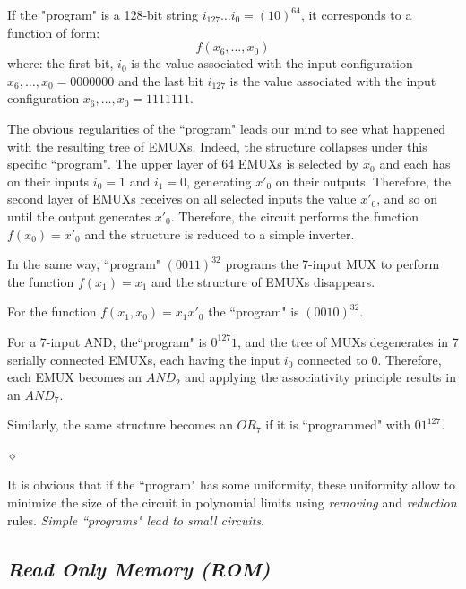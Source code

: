 \begin{exemplu}
If the "program" is a 128-bit string $i_{127} \ldots i_{0} =
(10)^{64}$, it corresponds to a function of form:
$$f(x_{6}, \ldots , x_{0})$$
where: the first bit, $i_{0}$ is the value associated with the input
configuration $x_{6}, \ldots , x_{0} = 0000000$ and the last bit
$i_{127}$ is the value associated with the input configuration $x_{6},
\ldots , x_{0} = 1111111$.

The obvious regularities of the ``program" leads our mind to see
what happened with the resulting tree of EMUXs. Indeed, the
structure collapses under this specific ``program". The upper
layer of 64 EMUXs is selected by $x_{0}$ and each has on their
inputs $i_{0} = 1$ and $i_{1} = 0$, generating $x'_{0}$ on their
outputs. Therefore, the second layer of EMUXs receives on all
selected inputs the value $x'_{0}$, and so on until the output
generates $x'_{0}$. Therefore, the circuit performs the function
$f(x_{0}) = x'_{0}$ and the structure is reduced to a simple
inverter.

In the same way, ``program" $(0011)^{32}$ programs the 7-input
MUX to perform the function $f(x_{1}) = x_{1}$ and the structure
of EMUXs disappears.

For the function $f(x_{1}, x_{0}) = x_{1}x'_{0}$ the ``program" is
$(0010)^{32}$.

For a 7-input AND, the``program" is $0^{127}1$, and the tree of
MUXs degenerates in 7 serially connected EMUXs, each having the
input $i_{0}$ connected to 0. Therefore, each EMUX becomes an
$AND_{2}$ and applying the associativity principle results in an
$AND_{7}$.

 Similarly, the same structure becomes an $OR_{7}$ if it is
``programmed" with $01^{127}$.

 $\diamond$
\end{exemplu}

It is obvious that if the ``program" has some uniformity, these
uniformity allow to minimize the size of the circuit in
polynomial limits using {\em removing} and {\em reduction} rules.
{\em Simple ``programs" lead to small circuits}.






\subsection{{\bf {\em Read Only Memory (ROM)}}}\label{ROM}

